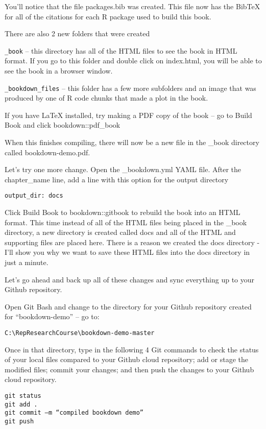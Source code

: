 \documentclass[
]{book}
\begin{document}
You'll notice that the file packages.bib was created. This file now has the BibTeX for all of the citations for each R package used to build this book.

There are also 2 new folders that were created

\texttt{\_book} -- this directory has all of the HTML files to see the book in HTML format. If you go to this folder and double click on index.html, you will be able to see the book in a browser window.

\texttt{\_bookdown\_files} -- this folder has a few more subfolders and an image that was produced by one of R code chunks that made a plot in the book.

If you have LaTeX installed, try making a PDF copy of the book -- go to Build Book and click bookdown::pdf\_book

When this finishes compiling, there will now be a new file in the \_book directory called bookdown-demo.pdf.

Let's try one more change. Open the \_bookdown.yml YAML file. After the chapter\_name line, add a line with this option for the output directory

\texttt{output\_dir:\ docs}

Click Build Book to bookdown::gitbook to rebuild the book into an HTML format. This time instead of all of the HTML files being placed in the \_book directory, a new directory is created called docs and all of the HTML and supporting files are placed here. There is a reason we created the docs directory - I'll show you why we want to save these HTML files into the docs directory in just a minute.

Let's go ahead and back up all of these changes and sync everything up to your Github repository.

Open Git Bash and change to the directory for your Github repository created for ``bookdown-demo'' -- go to:

\texttt{C:\textbackslash{}RepResearchCourse\textbackslash{}bookdown-demo-master}

Once in that directory, type in the following 4 Git commands to check the status of your local files compared to your Github cloud repository; add or stage the modified files; commit your changes; and then push the changes to your Github cloud repository.

\begin{verbatim}
git status
git add .
git commit –m “compiled bookdown demo”
git push
\end{verbatim}
\end{document}
